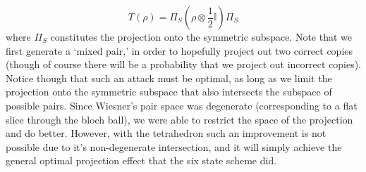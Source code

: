 \documentclass[12pt]{article}
\begin{document}
\begin{enumerate}
\begin{enumerate}
$$ T(\rho) = \Pi_S(\rho \otimes \frac{1}{2}\mathbb{I})\Pi_S $$
where $\Pi_S$ constitutes the projection onto the symmetric subspace. Note that we first generate a `mixed pair,' in order to hopefully project out two correct copies (though of course there will be a probability that we project out incorrect copies). Notice though that such an attack must be optimal, as long as we limit the projection onto the symmetric subspace that also intersects the subspace of possible pairs. Since Wiesner's pair space was degenerate (corresponding to a flat slice through the bloch ball), we were able to restrict the space of the projection and do better. However, with the tetrahedron such an improvement is not possible due to it's non-degenerate intersection, and it will simply achieve the general optimal projection effect that the six state scheme did.
\end{enumerate}
\end{enumerate}
\end{document}
